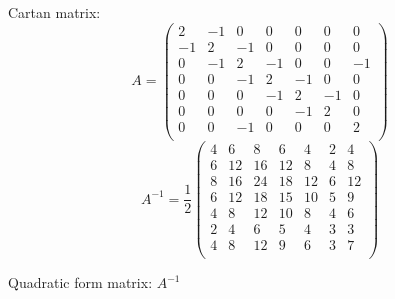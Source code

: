 \documentclass[12pt]{article}
\begin{document}
Cartan matrix:
\[
A=\left(
\begin{array}{ccccccc}
 2 &-1& 0& 0& 0 & 0 &0   \\
 -1& 2&-1& 0& 0 & 0 & 0 \\
 0 &-1& 2&-1& 0 & 0 & -1 \\
 0 &0 &-1& 2&-1 & 0 & 0\\
 0 &0 &0 &-1& 2 &-1 & 0 \\
 0 &0 & 0 & 0&-1& 2 & 0\\
 0 &0 &-1 & 0& 0& 0 & 2\\
\end{array}
\right)\]
\[
A^{-1}=
\frac{1}{2}\left(
\begin{array}{ccccccc}
  4& 6& 8& 6& 4& 2& 4 \\
  6&12&16&12& 8& 4& 8 \\
  8&16&24&18&12& 6& 12 \\
  6&12&18&15&10& 5& 9 \\
  4& 8&12&10& 8& 4& 6 \\
  2& 4& 6& 5& 4& 3& 3 \\
  4& 8&12& 9& 6& 3& 7 \\
\end{array}
\right)
\]

Quadratic form matrix: $A^{-1}$

%
%
\newpage
%
\end{document}
